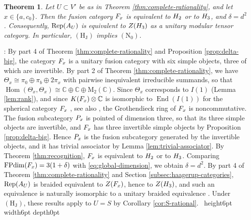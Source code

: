 \documentclass[leqno]{article}
\newcommand{\Cbb}{\ensuremath{\mathbb{C}}}
\newcommand{\M}{\mathrm{M}}
\let\cal\relax
\newcommand{\cal}{\mathcal}
\newcommand{\qed}{\hfill \vrule height6pt  width6pt depth0pt}
\newcommand{\ot}{\otimes}
\DeclareMathOperator{\Rep}{Rep} %
\newtheorem{thm}{Theorem}[section]
\newenvironment{proof}[1][]{\noindent {\it Proof #1} : }{\hbox{~}\qed
\smallskip
}
\numberwithin{equation}{section}
\begin{document}
\begin{thm}
\label{thm:Fx-haagerup}
Let $U \subset V'$ be as in Theorem \ref{thm:complete-rationality}, and let $x \in \{a,c_0\}$. Then the fusion category $\cal F_x$ is equivalent to $\cal H_2$ or to $\cal H_3$, and $\delta = d^2$. Consequently, $\Rep(\cal A_U)$ is equivalent to $Z(\cal H_3)$ as a unitary modular tensor category. In particular, $\mathrm{(H_J)}$ implies $\mathrm{(N_0)}$.
\end{thm}

\begin{proof}
By part 4 of Theorem \ref{thm:complete-rationality} and Proposition \ref{prop:delta-big}, the category $\cal F_x$ is a unitary fusion category with six simple objects, three of which are invertible. By part 2 of Theorem \ref{thm:complete-rationality}, we have $\Theta_x \cong \pi_0 \oplus \pi_b \oplus 2\pi_x$ with pairwise inequivalent irreducible summands, so that $\operatorname{Hom}(\Theta_x,\Theta_x) \cong \Cbb \oplus \Cbb \oplus \M_2(\Cbb)$. Since $\Theta_x$ corresponds to $I(1)$ (Lemma \ref{lem:rank}), and since $K(\cal F_x) \ot \Cbb$ is isomorphic to $\operatorname{End}(I(1))$ for the spherical category $\cal F_x$ \cite[Corollary 2.16 p.~7]{Ost15}, see also \cite[Corollary 3.4 p.~16]{BiJ22}, the Grothendieck ring of $\cal F_x$ is noncommutative. The fusion subcategory $\cal P_x$ is pointed of dimension three, so that its three simple objects are invertible, and $\cal F_x$ has three invertible simple objects by Proposition \ref{prop:delta-big}. Hence $\cal P_x$ is the fusion subcategory generated by the invertible objects, and it has trivial associator by Lemma \ref{lem:trivial-associator}. By Theorem \ref{thm:recognition}, $\cal F_x$ is equivalent to $\cal H_2$ or to $\cal H_3$. Comparing $\operatorname{FPdim}(\cal F_x) = 3(1+\delta)$ with \eqref{eq:global-dimension}, we obtain $\delta = d^2$. By part 4 of Theorem \ref{thm:complete-rationality} and Section \ref{subsec:haagerup-categories}, $\Rep(\cal A_U)$ is braided equivalent to $Z(\cal F_x)$, hence to $Z(\cal H_3)$, and such an equivalence is naturally isomorphic to a unitary braided equivalence \cite[Theorem 5 p.~2]{Reu23}. Under $\mathrm{(H_J)}$, these results apply to $U = S$ by Corollary \ref{cor:S-rational}.
\end{proof}
\end{document}
